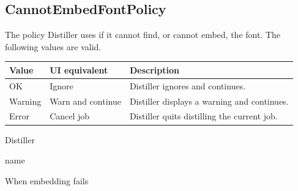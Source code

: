 \documentclass[letterpaper,12pt,english,openany,oneside]{sphinxmanual}
\begin{document}
\label{\detokenize{PDF_Create_CommonSettings:default-value-63}}

\begin{sphinxVerbatim}[commandchars=\\\{\}]
\PYG{p}{[}\PYG{p}{]}
\end{sphinxVerbatim}


\subsection{CannotEmbedFontPolicy}
\label{\detokenize{PDF_Create_CommonSettings:cannotembedfontpolicy}}
The policy Distiller uses if it cannot find, or cannot embed, the font. The following values are valid.


\begin{savenotes}\sphinxattablestart
\centering
{}\label{\detokenize{PDF_Create_CommonSettings:section-14}}\nobreak
\begin{tabulary}{\linewidth}[t]{|T|T|T|}
\hline
\sphinxstyletheadfamily 
Value
&\sphinxstyletheadfamily 
UI equivalent
&\sphinxstyletheadfamily 
Description
\\
\hline
OK
&
Ignore
&
Distiller ignores and continues.
\\
\hline
Warning
&
Warn and continue
&
Distiller displays a warning and continues.
\\
\hline
Error
&
Cancel job
&
Distiller quits distilling the current job.
\\
\hline
\end{tabulary}
\par
\sphinxattableend\end{savenotes}
\label{\detokenize{PDF_Create_CommonSettings:supported-by-68}}

Distiller

\label{\detokenize{PDF_Create_CommonSettings:type-68}}

name

\label{\detokenize{PDF_Create_CommonSettings:ui-name-54}}

When embedding fails

\label{\detokenize{PDF_Create_CommonSettings:default-value-64}}

\begin{sphinxVerbatim}[commandchars=\\\{\}]
\end{sphinxVerbatim}
\end{document}
